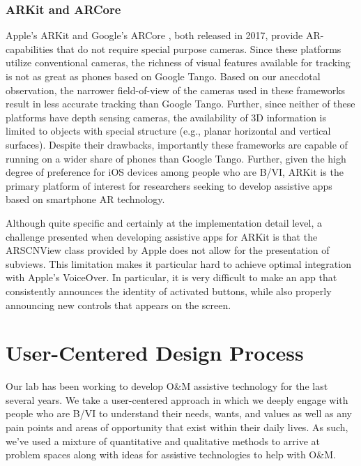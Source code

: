 \documentclass[chi_draft]{sigchi}
\newcommand{\BVI}{B/VI\xspace}
\newcommand{\OM}{O\&M\xspace}
\begin{document}
\subsubsection{ARKit and ARCore}

Apple's ARKit \cite{arkit} and Google's ARCore \cite{arcore}, both released in 2017, provide AR-capabilities that do not require special purpose cameras.  Since these platforms utilize conventional cameras, the richness of visual features available for tracking is not as great as phones based on Google Tango.  Based on our anecdotal observation, the narrower field-of-view of the cameras used in these frameworks result in less accurate tracking than Google Tango.  Further, since neither of these platforms have depth sensing cameras, the availability of 3D information is limited to objects with special structure (e.g., planar horizontal and vertical surfaces).  Despite their drawbacks, importantly these frameworks are capable of running on a wider share of phones than Google Tango.  Further, given the high degree of preference for iOS devices among people who are \BVI \cite{morris2014blind}, ARKit is the primary platform of interest for researchers seeking to develop assistive apps based on smartphone AR technology.

Although quite specific and certainly at the implementation detail level, a challenge presented when developing assistive apps for ARKit is that the ARSCNView class provided by Apple does not allow for the presentation of subviews.  This limitation makes it particular hard to achieve optimal integration with Apple's VoiceOver.  In particular, it is very difficult to make an app that consistently announces the identity of activated buttons, while also properly announcing new controls that appears on the screen.

\section{User-Centered Design Process}
Our lab has been working to develop \OM assistive technology for the last several years.  We take a user-centered approach in which we deeply engage with people who are \BVI to understand their needs, wants, and values as well as any pain points and areas of opportunity that exist within their daily lives.  As such, we've used a mixture of quantitative and qualitative methods to arrive at problem spaces along with ideas for assistive technologies to help with \OM.
\end{document}
